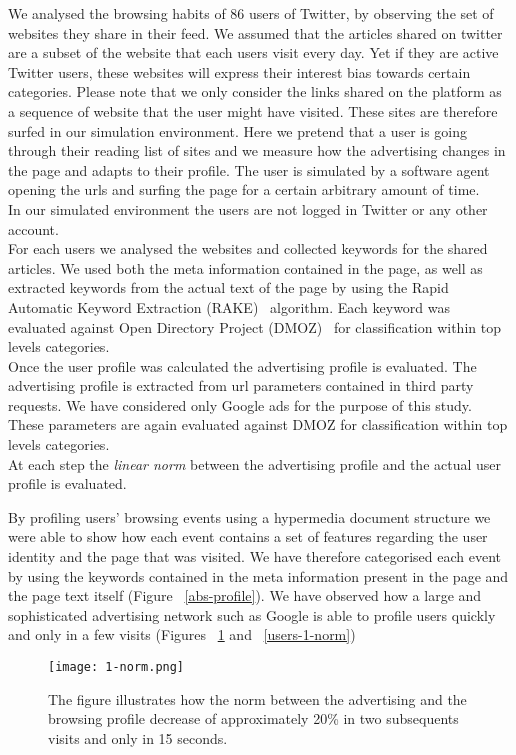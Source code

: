 \documentclass[runningheads,a4paper]{llncs}
\begin{document}
We analysed the browsing habits of 86 users of Twitter, by observing the set of websites they share in their feed. We assumed that the articles shared on twitter are a subset of the website that each users visit every day. Yet if they are active Twitter users, these websites will express their interest bias towards certain categories. Please note that we only consider the links shared on the platform as a sequence of website that the user might have visited. These sites are therefore surfed in our simulation environment. Here we pretend that a user is going through their reading list of sites and we measure how the advertising changes in the page and adapts to their profile. The user is simulated by a software agent opening the urls and surfing the page for a certain arbitrary amount of time.
\\
In our simulated environment the users are not logged in Twitter or any other account. 
\\
For each users we analysed the websites and collected keywords for the shared articles. We used both the meta information contained in the page, as well as extracted keywords from the actual text of the page by using the Rapid Automatic Keyword Extraction (RAKE)~\cite{RAKE} algorithm. Each keyword was evaluated against Open Directory Project (DMOZ)~\cite{a22} for classification within top levels categories.
\\
Once the user profile was calculated the advertising profile is evaluated. The advertising profile is extracted from url parameters contained in third party requests. We have considered only Google ads for the purpose of this study. These parameters are again evaluated against DMOZ for classification within top levels categories.
\\
At each step the \emph{linear norm} between the advertising profile and the actual user profile is evaluated. 

By profiling users' browsing events using a hypermedia document structure we were able to show how each event contains a set of features regarding the user identity and the page that was visited. We have therefore categorised each event by using the keywords contained in the meta information present in the page and the page text itself (Figure ~\ref{abs-profile}). We have observed how a large and sophisticated advertising network such as Google is able to profile users quickly and only in a few visits (Figures ~\ref{1-norm} and ~\ref{users-1-norm}) 

\begin{figure}[!ht]
\centering
\texttt{[image: 1-norm.png]}
\caption{The figure illustrates how the norm between the advertising and the browsing profile decrease of approximately 20\% in two subsequents visits and only in 15 seconds.
\label{1-norm}}
\end{figure}
\end{document}
